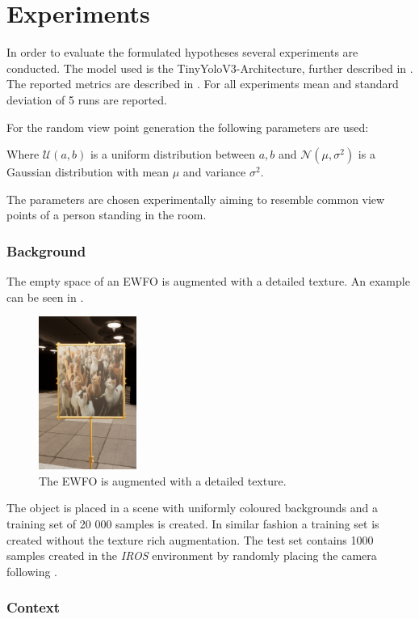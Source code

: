 \section{Experiments}
\label{sec:training:experiments}
In order to evaluate the formulated hypotheses several experiments are conducted. The model used is the TinyYoloV3-Architecture, further described in . The reported metrics are described in . For all experiments mean and standard deviation of 5 runs are reported.

For the random view point generation the following parameters are used:


Where $ \mathcal{U}(a,b)$ is a uniform distribution between $a,b$ and $\mathcal{N}(\mu,\sigma^2)$ is a Gaussian distribution with mean $\mu$ and variance $\sigma^2$.

The parameters are chosen experimentally aiming to resemble common view points of a person standing in the room.


\subsubsection{Background}

The empty space of an \ac{EWFO} is augmented with a detailed texture. An example can be seen in .
\begin{figure}
	\centering
	\includegraphics[height=5cm]{fig/cat}
	\caption{The \ac{EWFO} is augmented with a detailed texture.}
	\label{fig:cats}
\end{figure}

The object is placed in a scene with uniformly coloured backgrounds and a training set of 20 000 samples is created. In similar fashion a training set is created without the texture rich augmentation. The test set contains 1000 samples created in the \textit{IROS} environment by randomly placing the camera following .


\subsubsection{Context}


